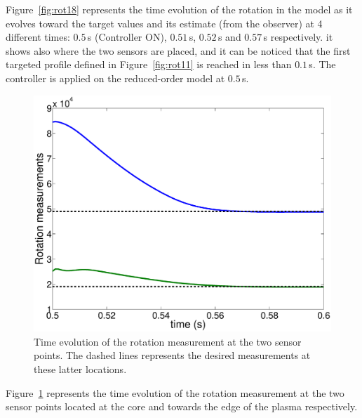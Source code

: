 \documentclass[12pt]{iopart}
\begin{document}
Figure~\ref{fig:rot18} represents the time evolution of the rotation in the model as it evolves toward the target values and its estimate (from the observer) at 4 different times: $0.5$\,s (Controller ON), $0.51$\,s, $0.52$\,s and $0.57$\,s respectively. it shows also where the two sensors are placed, and it can be noticed that the first targeted profile defined in Figure~\ref{fig:rot11} is reached in less than $0.1$\,s. The controller is applied on the reduced-order model at $0.5$\,s.
\begin{figure}
\centering
\includegraphics[width=\linewidth]{imene_figs/Goum20n} 
\caption{Time evolution of the rotation measurement at the two sensor points. The dashed lines represents the desired measurements at these latter locations. }
\label{fig:rot20}
\end{figure}    

Figure~\ref{fig:rot20} represents the time evolution of the rotation measurement at the two sensor points located at the core and towards the edge of the plasma respectively.  
\end{document}
